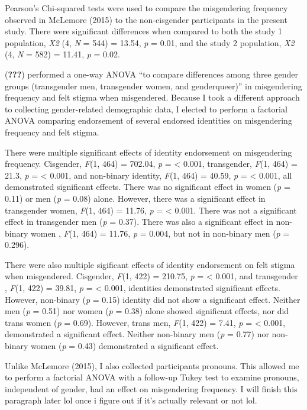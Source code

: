 \documentclass[12pt,twoside]{reedthesis}
\begin{document}
Pearson's Chi-squared tests were used to compare the misgendering frequency observed in McLemore (2015) to the non-cisgender participants in the present study.
There were significant differences when compared to both the study 1 population, \emph{X2} (4, \emph{N} = 544) = 13.54, \emph{p} = 0.01, and the study 2 population, \emph{X2} (4, \emph{N} = 582) = 11.41, \emph{p} = 0.02.

({\textbf{???}}) performed a one-way ANOVA ``to compare differences among three gender groups (transgender men, transgender women, and genderqueer)'' in misgendering frequency and felt stigma when misgendered.
Because I took a different approach to collecting gender-related demographic data, I elected to perform a factorial ANOVA comparing endorsement of several endorsed identities on misgendering frequency and felt stigma.

There were multiple significant effects of identity endorsement on misgendering frequency.
Cisgender, \emph{F}(1, 464) = 702.04, \emph{p} = \textless{} 0.001,
transgender, \emph{F}(1, 464) = 21.3, \emph{p} = \textless{} 0.001,
and non-binary identity, \emph{F}(1, 464) = 40.59, \emph{p} = \textless{} 0.001, all demonstrated significant effects.
There was no significant effect in women (\emph{p} = 0.11) or men (\emph{p} = 0.08) alone.
However, there was a significant effect in transgender women, \emph{F}(1, 464) = 11.76, \emph{p} = \textless{} 0.001.
There was not a significant effect in transgender men (\emph{p} = 0.37).
There was also a significant effect in non-binary women , \emph{F}(1, 464) = 11.76, \emph{p} = 0.004,
but not in non-binary men (\emph{p} = 0.296).

There were also multiple sigificant effects of identity endorsement on felt stigma when misgendered.
Cisgender, \emph{F}(1, 422) = 210.75, \emph{p} = \textless{} 0.001,
and transgender , \emph{F}(1, 422) = 39.81, \emph{p} = \textless{} 0.001, identities demonstrated significant effects.
However, non-binary (\emph{p} = 0.15) identity did not show a significant effect.
Neither men (\emph{p} = 0.51) nor women (\emph{p} = 0.38) alone showed significant effects, nor did trans women (\emph{p} = 0.69).
However, trans men, \emph{F}(1, 422) = 7.41, \emph{p} = \textless{} 0.001, demonstrated a significant effect.
Neither non-binary men (\emph{p} = 0.77) nor non-binary women (\emph{p} = 0.43) demonstrated a significant effect.

Unlike McLemore (2015), I also collected participants pronouns. This allowed me to perform a factorial ANOVA with a follow-up Tukey test to examine pronouns, independent of gender, had an effect on misgendering frequency. I will finish this paragraph later lol once i figure out if it's actually relevant or not lol.
\end{document}
